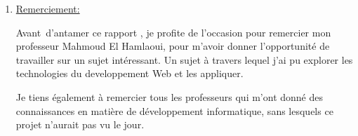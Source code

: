 \documentclass[12pt]{article}
\begin{document}
\vspace{\baselineskip}
\begin{enumerate}
	\item \uline{Remerciement:}\par


\vspace{\baselineskip}
{\fontsize{14pt}{16.8pt}\selectfont Avant\ d’antamer ce rapport , je profite de l’occasion pour remercier mon professeur Mahmoud El Hamlaoui, pour m’avoir donner l’opportunité de travailler sur un sujet intéressant. Un sujet à travers lequel j’ai pu  explorer les technologies du developpement Web et les appliquer. \par}\par

{\fontsize{14pt}{16.8pt}\selectfont Je tiens également à remercier tous les professeurs qui m’ont donné des connaissances en matière de développement informatique, sans lesquels ce projet n’aurait pas vu le jour.\par}\par


\vspace{\baselineskip}

\vspace{\baselineskip}

\vspace{\baselineskip}

\vspace{\baselineskip}

\vspace{\baselineskip}

\vspace{\baselineskip}

\vspace{\baselineskip}

\vspace{\baselineskip}

\vspace{\baselineskip}

\vspace{\baselineskip}

\vspace{\baselineskip}

\vspace{\baselineskip}

\vspace{\baselineskip}

\vspace{\baselineskip}

\vspace{\baselineskip}


\end{enumerate}
\end{document}
